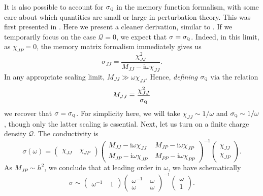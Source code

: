 \documentclass[10pt, oneside]{book}
\begin{document}
\begin{doublespace}
It is also possible to account for $\sigma_{\textsc{q}}$ in the memory function formalism, with some care about which quantities are small or large in perturbation theory.   This was first presented in  \cite{Lucas:2015pxa}.  Here we present a cleaner derivation, similar to \cite{Davison:2016hno}.  If we temporarily focus on the case $\mathcal{Q}=0$, we expect that $\sigma=\sigma_{\textsc{q}}$.   Indeed, in this limit, as $\chi_{JP}=0$,  the memory matrix formalism immediately gives us \begin{equation}
\sigma_{JJ} = \frac{\chi_{JJ}^2}{M_{JJ} - \mathrm{i}\omega \chi_{JJ}}.
\end{equation}
In any appropriate scaling limit, $M_{JJ}\gg \omega \chi_{JJ}$.   Hence, \emph{defining} $\sigma_{\textsc{q}}$ via the relation \begin{equation}
M_{JJ} \equiv \frac{\chi_{JJ}^2}{\sigma_{\textsc{q}}}  \label{eq:MJJsigmaQ}
\end{equation}
we recover that $\sigma=\sigma_{\textsc{q}}$.   For simplicity here, we will take $\chi_{JJ} \sim 1/\omega$ and $\sigma_{\textsc{q}} \sim 1/\omega$, though only the latter scaling is essential.  Next, let us turn on a finite charge density $\mathcal{Q}$.   The conductivity is \begin{equation}
\sigma(\omega) = \left(\begin{array}{cc}  \chi_{JJ} &\ \chi_{JP} \end{array}\right) \left(\begin{array}{cc}  M_{JJ} - \mathrm{i}\omega \chi_{JJ} &\  M_{JP} - \mathrm{i}\omega \chi_{JP} \\ M_{JP} - \mathrm{i}\omega \chi_{JP}  &\ M_{PP} - \mathrm{i}\omega \chi_{PP}\end{array}\right)^{-1}  \left(\begin{array}{c} \chi_{JJ} \\ \chi_{JP} \end{array}\right).
\end{equation}
As $M_{JP}\sim h^2$, we conclude that at leading order in $\omega$, we have schematically \begin{equation}
\sigma \sim \left(\begin{array}{cc} \omega^{-1} &\ 1 \end{array}\right) \left(\begin{array}{cc}  \omega^{-1} &\  \omega \\ \omega  &\ \omega \end{array}\right)^{-1}  \left(\begin{array}{c} \omega  \\ 1\end{array}\right).

\end{equation}
\end{doublespace}
\end{document}
